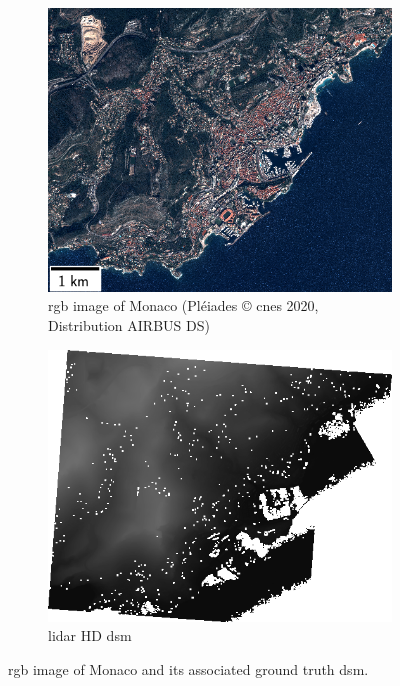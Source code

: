 \begin{figure}
    \centering
    \begin{subfigure}[t]{0.48\linewidth}
        \flushleft
        \includegraphics[width=\linewidth]{Images/Chap_6/miniature_Monaco.png}
        \caption{\acrshort{rgb} image of Monaco (Pléiades © \acrshort{cnes} 2020, Distribution AIRBUS DS)}
        \label{fig:miniature_Monaco_rgb}
    \end{subfigure}\hfill
    \begin{subfigure}[t]{0.48\linewidth}
        \flushright
        \includegraphics[width=\linewidth]{Images/Chap_6/miniature_Monaco_gt.png}
        \caption{\acrshort{lidar} HD \acrshort{dsm}}
        \label{fig:miniature_Monaco_gt}
    \end{subfigure}
    \caption{\acrshort{rgb} image of Monaco and its associated ground truth \acrshort{dsm}.}
    \label{fig:miniature_Monaco}
\end{figure}

